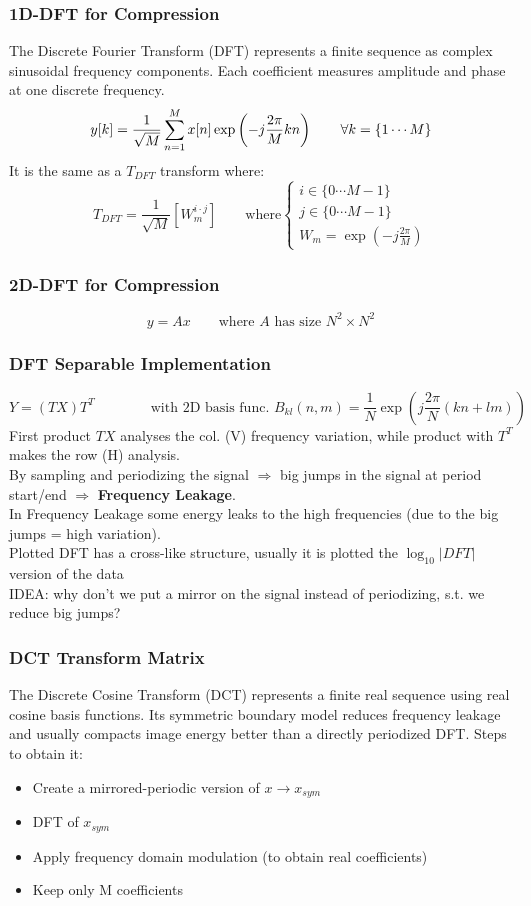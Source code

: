 \subsubsection{1D-DFT for Compression}
The Discrete Fourier Transform (DFT) represents a finite sequence as complex sinusoidal frequency components. Each coefficient measures amplitude and phase at one discrete frequency.
$$y[k] = \frac{1}{\sqrt{M}}\sr{M}{n=1}x[n]\exp\left(-j\frac{2\pi}{M}kn\right) \qquad \forall k = \{1 \cdots M\}$$
It is the same as a $T_{DFT}$ transform where:
$$T_{DFT} = \frac{1}{\sqrt{M}} \left[W_m^{i \cdot j}\right] \qquad \text{where} \begin{cases}
    i \in \{0 \cdots M-1\}\\
    j \in \{0 \cdots M-1\}\\
    W_m = \exp\left(-j\frac{2\pi}{M}\right)
\end{cases}$$
\subsubsection{2D-DFT for Compression}
$$y = Ax \qquad \text{where } A \text{ has size }N^2 \times N^2$$ 
\subsubsection{DFT Separable Implementation}
$$Y = \left(T X\right)T^T \qquad \qquad \text{with 2D basis func. }B_{kl}(n,m)=\frac{1}{N}\exp\left(j\frac{2\pi}{N}(kn+lm)\right)$$
First product $TX$ analyses the col. (V) frequency variation, while product with $T^T$ makes the row (H) analysis.\\
By sampling and periodizing the signal $\Rightarrow$ big jumps in the signal at period start/end $\Rightarrow$ \textbf{Frequency Leakage}.\\
In Frequency Leakage some energy leaks to the high frequencies (due to the big jumps = high variation).\\
Plotted DFT has a cross-like structure, usually it is plotted the $\log_{10}|DFT|$ version of the data\\
IDEA: why don't we put a mirror on the signal instead of periodizing, s.t. we reduce big jumps?
\subsubsection{DCT Transform Matrix}
The Discrete Cosine Transform (DCT) represents a finite real sequence using real cosine basis functions. Its symmetric boundary model reduces frequency leakage and usually compacts image energy better than a directly periodized DFT.
Steps to obtain it:
\begin{itemize}
    \item Create a mirrored-periodic version of $x \to x_{sym}$
    \item DFT of $x_{sym}$
    \item Apply frequency domain modulation (to obtain real coefficients)
    \item Keep only M coefficients
\end{itemize}
